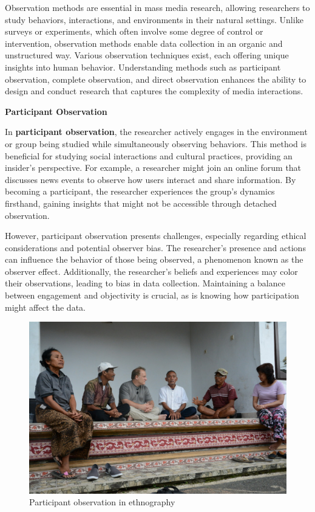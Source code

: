 \documentclass[
]{book}
\begin{document}
Observation methods are essential in mass media research, allowing researchers to study behaviors, interactions, and environments in their natural settings. Unlike surveys or experiments, which often involve some degree of control or intervention, observation methods enable data collection in an organic and unstructured way. Various observation techniques exist, each offering unique insights into human behavior. Understanding methods such as participant observation, complete observation, and direct observation enhances the ability to design and conduct research that captures the complexity of media interactions.

\textbf{Participant Observation}

In \textbf{participant observation}, the researcher actively engages in the environment or group being studied while simultaneously observing behaviors. This method is beneficial for studying social interactions and cultural practices, providing an insider's perspective. For example, a researcher might join an online forum that discusses news events to observe how users interact and share information. By becoming a participant, the researcher experiences the group's dynamics firsthand, gaining insights that might not be accessible through detached observation.

However, participant observation presents challenges, especially regarding ethical considerations and potential observer bias. The researcher's presence and actions can influence the behavior of those being observed, a phenomenon known as the observer effect. Additionally, the researcher's beliefs and experiences may color their observations, leading to bias in data collection. Maintaining a balance between engagement and objectivity is crucial, as is knowing how participation might affect the data.

\begin{figure}
\centering
\includegraphics[width=1\linewidth,height=\textheight,keepaspectratio]{images/part-observation.jpg}
\caption{Participant observation in ethnography}
\end{figure}
\end{document}
